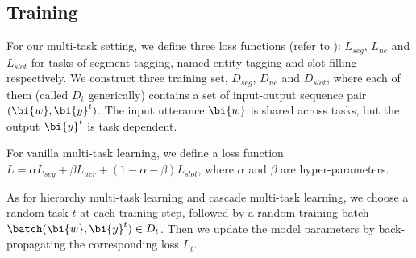 \subsection{Training}
\label{sec:training}
For our multi-task setting, 
we define three loss functions (refer to ):
$L_{seg}$, $L_{ne}$ and $L_{slot}$ for tasks of segment tagging, named entity tagging and slot filling respectively.
We construct three training set,
$D_{seg}$, $D_{ne}$ and $D_{slot}$,
where each of them (called $D_t$ generically) contains a set of 
input-output sequence pair $(\bi{w}, \bi{y}^t)$.
The input utterance $\bi{w}$ is shared across tasks, but the output $\bi{y}^t$ is task dependent.

For vanilla multi-task learning,
we define a loss function $L=\alpha L_{seg}+\beta L_{ner}+(1-\alpha-\beta)L_{slot}$, 
where $\alpha$ and $\beta$ are hyper-parameters.

As for hierarchy multi-task learning and cascade multi-task learning,
we choose a random task $t$ at each training step,
followed by a random training batch $\batch(\bi{w}, \bi{y}^t) \in D_t$.
Then we update the model parameters by back-propagating
the corresponding loss $L_t$.
